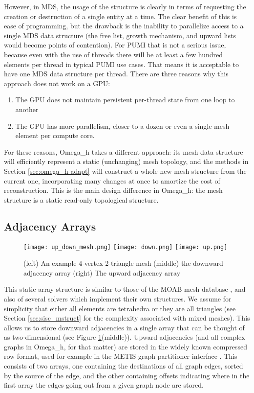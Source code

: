 However, in MDS, the usage of the structure is clearly in terms
of requesting the creation or destruction of a single entity at
a time.
The clear benefit of this is ease of programming, but the drawback
is the inability to parallelize access to a single MDS data structure
(the free list, growth mechanism, and upward lists would become
points of contention).
For PUMI that is not a serious issue, because even with the use of
threads there will be at least a few hundred elements per thread
in typical PUMI use cases.
That means it is acceptable to have one MDS data structure per thread.
There are three reasons why this approach does not work on a GPU:
\begin{enumerate}
\item The GPU does not maintain persistent per-thread state from
one loop to another
\item The GPU has more parallelism, closer to a dozen or even
a single mesh element per compute core.
\end{enumerate}
For these reasons, Omega\_h takes a different approach:
its mesh data structure will efficiently represent a static
(unchanging) mesh topology, and the methods in Section \ref{sec:omega_h-adapt}
will construct a whole new mesh structure from the current
one, incorporating many changes at once to amortize the
cost of reconstruction.
This is the main design difference in Omega\_h: the mesh
structure is a static read-only topological structure.

\subsection{Adjacency Arrays}
\label{sec:adj_arr}

\begin{figure}
\begin{center}
\texttt{[image: up\_down\_mesh.png]}
\texttt{[image: down.png]}
\texttt{[image: up.png]}
\caption{(left) An example 4-vertex 2-triangle mesh
(middle) the downward adjacency array
(right) The upward adjacency array}
\label{fig:osh_up_down}
\end{center}
\end{figure}

This static array structure is similar to those
of the MOAB mesh database \cite{tautges2004moab},
and also of several solvers which implement their own structures.
We assume for simplicity that either all elements are tetrahedra
or they are all triangles (see Section \ref{sec:sisc_mstruct} for
the complexity associated with mixed meshes).
This allows us to store downward adjacencies in a single array
that can be thought of as two-dimensional
(see Figure \ref{fig:osh_up_down}(middle)).
Upward adjacencies (and all complex graphs in Omega\_h, for that matter)
are stored in the widely known compressed row format,
used for example in the METIS graph partitioner interface \cite{METIS}.
This consists of two arrays, one containing the destinations
of all graph edges, sorted by the source of the edge,
and the other containing offsets indicating where in the first
array the edges going out from a given graph node are stored.

